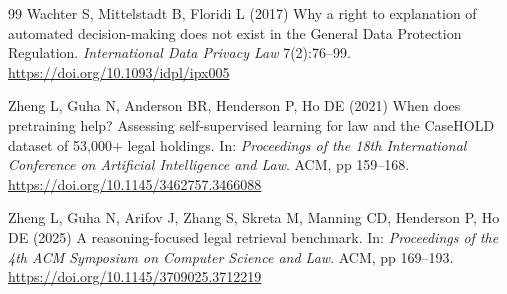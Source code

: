 \documentclass[12pt,a4paper]{article}
\begin{document}
\begin{thebibliography}{99}
Wachter S, Mittelstadt B, Floridi L (2017) Why a right to explanation of automated decision-making does not exist in the General Data Protection Regulation. \textit{International Data Privacy Law} 7(2):76--99. \url{https://doi.org/10.1093/idpl/ipx005}

Zheng L, Guha N, Anderson BR, Henderson P, Ho DE (2021) When does pretraining help? Assessing self-supervised learning for law and the CaseHOLD dataset of 53,000+ legal holdings. In: \textit{Proceedings of the 18th International Conference on Artificial Intelligence and Law}. ACM, pp 159--168. \url{https://doi.org/10.1145/3462757.3466088}

Zheng L, Guha N, Arifov J, Zhang S, Skreta M, Manning CD, Henderson P, Ho DE (2025) A reasoning-focused legal retrieval benchmark. In: \textit{Proceedings of the 4th ACM Symposium on Computer Science and Law}. ACM, pp 169--193. \url{https://doi.org/10.1145/3709025.3712219}

\end{thebibliography}
\end{document}
